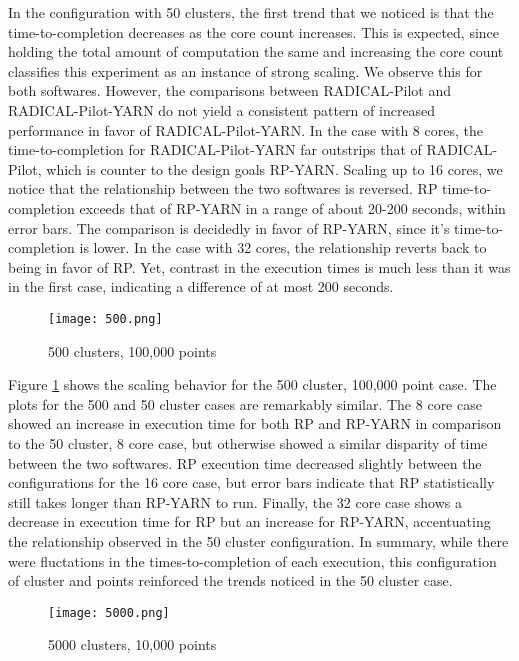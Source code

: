 \documentclass[]{article}
\begin{document}
		In the configuration with 50 clusters, the first trend that we noticed is that the time-to-completion decreases as the core count increases. This is expected, since holding the total amount of computation the same and increasing the core count classifies this experiment as an instance of strong scaling. We observe this for both softwares. However, the comparisons between RADICAL-Pilot and RADICAL-Pilot-YARN do not yield a consistent pattern of increased performance in favor of RADICAL-Pilot-YARN. In the case with 8 cores, the time-to-completion for RADICAL-Pilot-YARN far outstrips that of RADICAL-Pilot, which is counter to the design goals RP-YARN. Scaling up to 16 cores, we notice that the relationship between the two softwares is reversed. RP time-to-completion exceeds that of RP-YARN in a range of about 20-200 seconds, within error bars. The comparison is decidedly in favor of RP-YARN, since it's time-to-completion is lower. In the case with 32 cores, the relationship reverts back to being in favor of RP. Yet, contrast in the execution times is much less than it was in the first case, indicating a difference of at most 200 seconds.

		\begin{figure}[H]
			\centering
			\texttt{[image: 500.png]}
			\caption{500 clusters, 100,000 points}
			\label{fig:500}
		\end{figure}

		Figure \ref{fig:500} shows the scaling behavior for the 500 cluster, 100,000 point case. The plots for the 500 and 50 cluster cases are remarkably similar. The 8 core case showed an increase in execution time for both RP and RP-YARN in comparison to the 50 cluster, 8 core case, but otherwise showed a similar disparity of time between the two softwares. RP execution time decreased slightly between the configurations for the 16 core case, but error bars indicate that RP statistically still takes longer than RP-YARN to run. Finally, the 32 core case shows a decrease in execution time for RP but an increase for RP-YARN, accentuating the relationship observed in the 50 cluster configuration. In summary, while there were fluctations in the times-to-completion of each execution, this configuration of cluster and points reinforced the trends noticed in the 50 cluster case. 

		\begin{figure}[H]
			\centering
			\texttt{[image: 5000.png]}
			\caption{5000 clusters, 10,000 points}
			\label{fig:5000}
		\end{figure}
\end{document}
